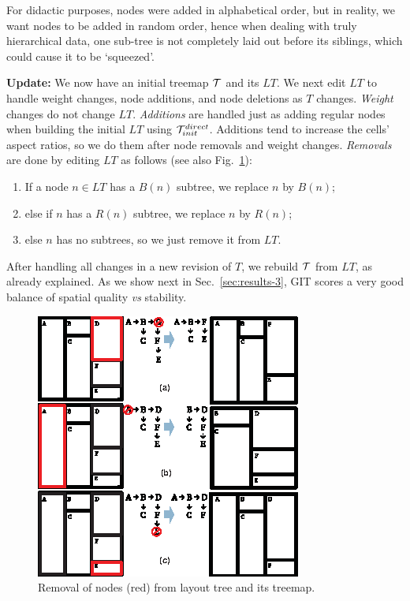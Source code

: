 For didactic purposes, nodes were added in alphabetical order, but in reality, we want nodes to be added in random order, hence when dealing with truly hierarchical data, one sub-tree is not completely laid out before its siblings, which could cause it to be `squeezed'.

\noindent\textbf{Update:} We now have an initial treemap ${\cal T}$ and its $LT$. We next edit $LT$ to handle weight changes, node additions, and node deletions as $T$ changes. \emph{Weight} changes do not change $LT$. \emph{Additions} are handled just as adding regular nodes when building the initial $LT$ using ${\cal T}_{init}^{direct}$. Additions tend to increase the cells' aspect ratios, so we do them after node removals and weight changes. \emph{Removals} are done by editing $LT$ as follows (see also Fig.~\ref{fig:git_removal}):

\begin{enumerate}
\item If a node $n\in LT$ has a $B(n)$ subtree, we replace $n$ by $B(n)$;
\item else if $n$ has a $R(n)$ subtree, we replace $n$ by $R(n)$;
\item else $n$ has no subtrees, so we just remove it from $LT$.
\end{enumerate}

After handling all changes in a new revision of $T$, we rebuild ${\cal T}$ from $LT$, as already explained. As we show next in Sec.~\ref{sec:results-3}, GIT scores a very good balance of spatial quality \emph{vs} stability.

\begin{figure}[htbp!]
\centering
\includegraphics[width=.8\textwidth]{figures/treemap-algorithm/git_removal.eps}
\caption{Removal of nodes (red) from layout tree and its treemap.}
\label{fig:git_removal}
\end{figure}


